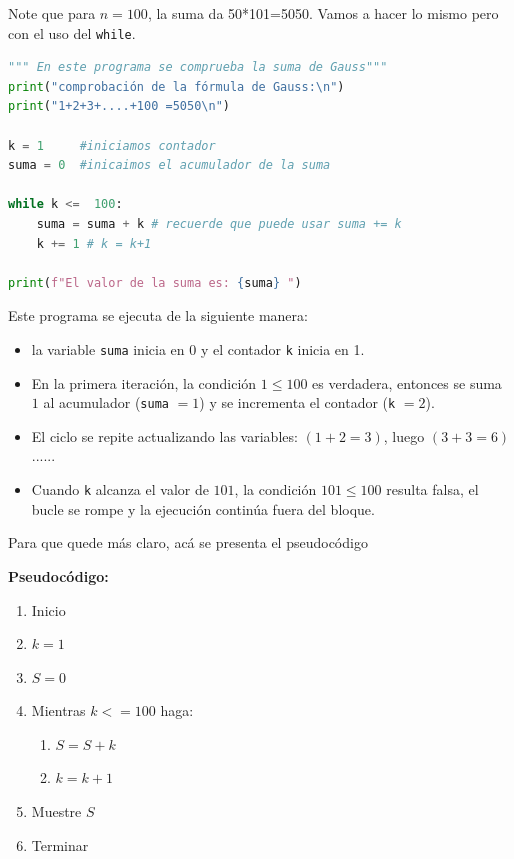 \documentclass[12pt]{article}
\begin{document}
Note que para $n=100$, la suma da 50*101=5050. Vamos a hacer lo mismo pero con 
el uso del \lstinline|while|.
%
\begin{lstlisting}[language=Python, captionpos=t, title=\texttt{gauss.py}]
""" En este programa se comprueba la suma de Gauss"""    
print("comprobación de la fórmula de Gauss:\n")
print("1+2+3+....+100 =5050\n")

k = 1     #iniciamos contador
suma = 0  #inicaimos el acumulador de la suma

while k <=  100:
    suma = suma + k # recuerde que puede usar suma += k
    k += 1 # k = k+1

print(f"El valor de la suma es: {suma} ")
\end{lstlisting}
Este programa se ejecuta de la siguiente manera:
\begin{itemize}
    \item la variable \lstinline|suma| inicia en $0$ y el contador \lstinline|k| inicia en 1.
    \item En la primera iteración, la condición $1 \le 100$ es verdadera, entonces
    se suma $1$ al acumulador (\lstinline|suma| $= 1$) y se incrementa el contador (\lstinline|k| $= 2$).
    \item El ciclo se repite actualizando las variables: $(1+2=3)$, luego $(3+3=6)$......
    \item  Cuando \lstinline|k| alcanza el valor de $101$, la condición $101 \le 100$ 
    resulta falsa, el bucle se rompe y la ejecución continúa fuera del bloque.
\end{itemize}

Para que quede más claro, acá se presenta el pseudocódigo

\noindent \textbf{Pseudocódigo:}
\begin{enumerate}[label=\arabic*)]
    \item Inicio
    \item $k = 1$
    \item $S = 0$
    \item Mientras $k <= 100$ haga:
    \begin{enumerate}[label=\alph*)]
        \item $S = S + k$
        \item $k = k + 1$
    \end{enumerate}
    \item Muestre $S$
    \item Terminar
\end{enumerate}
\end{document}
